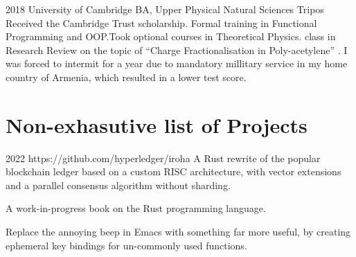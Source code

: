 \documentclass{CurriculumVitae}[10pt, condensed]
\begin{document}
{%
          {2018}%
          {University of Cambridge}%
          {BA, Upper }%
          {Physical Natural Sciences Tripos}%
          {
            Received the Cambridge Trust scholarship. Formal training
            in Functional Programming and OOP.\@ Took optional courses
            in Theoretical Physics.  class in Research Review
            on the topic of ``Charge Fractionalisation in Poly-acetylene''%
            \cite{charge-frac}. I was forced to intermit for a year due to
            mandatory millitary service in my home country of Armenia,
            which resulted in a lower test score.
          }
\begin{comment}
  \education{2013}%
  {2015}%
  {Russian-Armenian (Slavonic) University (RAU)}%
  {BA, GPA 3.82\footnote{Discontinued in favour of Cambridge}}%
  {Electronics and Nanoelectronics}%
  {%
    I was an active participant\cite{cu2o,measurement} in the
    scientific research happening at the RAU solid state
    laboratory.  I was consistently the top student at the
    Institute of Mathematics and High Technology of RAU.  My
    coursework on digital circuits was given the first and to
    this date only perfect score for coursework at RAU.
  }%
\end{comment}
\vfill
\section*{Non-exhasutive list of Projects}%
%
%
        {2022}%
        {https://github.com/hyperledger/iroha}%
        {%
          A Rust rewrite of the popular blockchain ledger based on a custom
          RISC architecture, with vector extensions and a parallel consensus
          algorithm without sharding.
        }%


  {%
    A work-in-progress book on the Rust programming language.
  }%

  {%
    Replace the annoying beep in Emacs with something far more useful,
    by creating ephemeral key bindings for un-commonly used functions.
  }%


}
\end{document}
